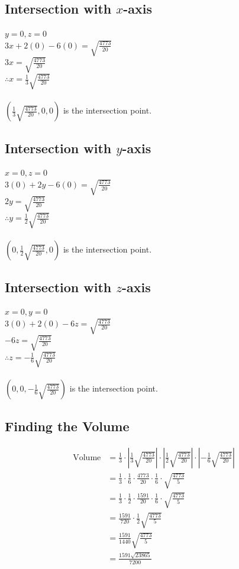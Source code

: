 \documentclass[12pt]{report}
\begin{document}
\subsection*{Intersection with $x$-axis}
$y=0, z=0$ \\
$3x+2(0)-6(0)=\sqrt{\frac{4773}{20}}$ \\
$3x=\sqrt{\frac{4773}{20}}$ \\
$\therefore x=\frac{1}{3}\sqrt{\frac{4773}{20}}$
\\\\
$(\frac{1}{3}\sqrt{\frac{4773}{20}},0,0)$ is the intersection point.

\subsection*{Intersection with $y$-axis}
$x=0, z=0$ \\
$3(0)+2y-6(0)=\sqrt{\frac{4773}{20}}$ \\
$2y=\sqrt{\frac{4773}{20}}$ \\
$\therefore y=\frac{1}{2}\sqrt{\frac{4773}{20}}$
\\\\
$(0,\frac{1}{2}\sqrt{\frac{4773}{20}},0)$ is the intersection point.

\subsection*{Intersection with $z$-axis}
$x=0, y=0$ \\
$3(0)+2(0)-6z=\sqrt{\frac{4773}{20}}$ \\
$-6z=\sqrt{\frac{4773}{20}}$ \\
$\therefore z=-\frac{1}{6}\sqrt{\frac{4773}{20}}$
\\\\
$(0,0,-\frac{1}{6}\sqrt{\frac{4773}{20}})$ is the intersection point.

\subsection*{Finding the Volume}
\begin{align*}
    \text{Volume} &= \frac{1}{3}\cdot\left|\frac{1}{3}\sqrt{\frac{4773}{20}}\right|\cdot\left|\frac{1}{2}\sqrt{\frac{4773}{20}}\right|\cdot\left|-\frac{1}{6}\sqrt{\frac{4773}{20}}\right| \\
    &= \frac{1}{3}\cdot\frac{1}{6}\cdot\frac{4773}{20}\cdot\frac{1}{6}\cdot\sqrt{\frac{4773}{5}} \\
    &=\frac{1}{3}\cdot\frac{1}{2}\cdot\frac{1591}{20}\cdot\frac{1}{6}\cdot\sqrt{\frac{4773}{5}} \\
    &=\frac{1591}{720}\cdot\frac{1}{2}\sqrt{\frac{4773}{5}} \\
    &=\frac{1591}{1440}\sqrt{\frac{4773}{5}} \\
    &=\frac{1591\sqrt{23865}}{7200}
\end{align*}
\end{document}
